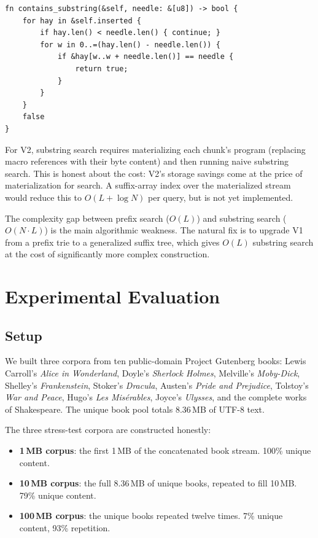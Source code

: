\documentclass[conference]{IEEEtran}
\begin{document}
\begin{lstlisting}[caption={V1 substring search: $O(N{\cdot}L)$ worst case.},label={lst:sub}]
fn contains_substring(&self, needle: &[u8]) -> bool {
    for hay in &self.inserted {
        if hay.len() < needle.len() { continue; }
        for w in 0..=(hay.len() - needle.len()) {
            if &hay[w..w + needle.len()] == needle {
                return true;
            }
        }
    }
    false
}
\end{lstlisting}

For V2, substring search requires materializing each chunk's program (replacing macro references with their byte content) and then running naive substring search. This is honest about the cost: V2's storage savings come at the price of materialization for search. A suffix-array index over the materialized stream would reduce this to $O(L + \log N)$ per query, but is not yet implemented.

The complexity gap between prefix search ($O(L)$) and substring search ($O(N{\cdot}L)$) is the main algorithmic weakness. The natural fix is to upgrade V1 from a prefix trie to a generalized suffix tree, which gives $O(L)$ substring search at the cost of significantly more complex construction.

\section{Experimental Evaluation}
\label{sec:eval}

\subsection{Setup}

We built three corpora from ten public-domain Project Gutenberg books: Lewis Carroll's \emph{Alice in Wonderland}, Doyle's \emph{Sherlock Holmes}, Melville's \emph{Moby-Dick}, Shelley's \emph{Frankenstein}, Stoker's \emph{Dracula}, Austen's \emph{Pride and Prejudice}, Tolstoy's \emph{War and Peace}, Hugo's \emph{Les Mis\'erables}, Joyce's \emph{Ulysses}, and the complete works of Shakespeare. The unique book pool totals 8.36\,MB of UTF-8 text.

The three stress-test corpora are constructed honestly:
\begin{itemize}
\item \textbf{1\,MB corpus}: the first 1\,MB of the concatenated book stream. 100\% unique content.
\item \textbf{10\,MB corpus}: the full 8.36\,MB of unique books, repeated to fill 10\,MB. 79\% unique content.
\item \textbf{100\,MB corpus}: the unique books repeated twelve times. 7\% unique content, 93\% repetition.
\end{itemize}
\end{document}
